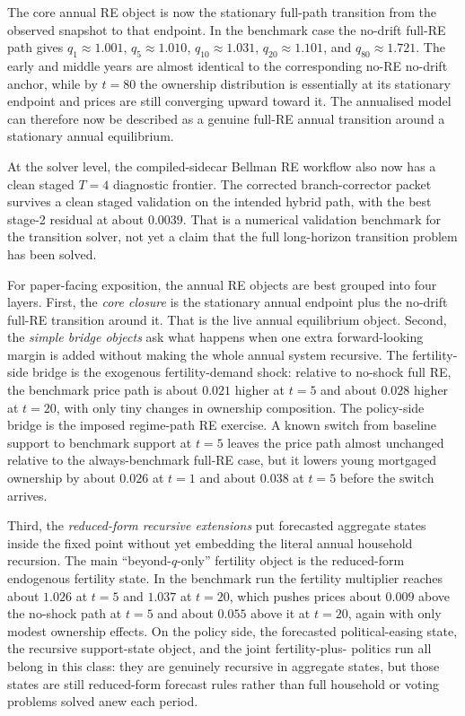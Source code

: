 The core annual RE object is now the stationary full-path transition from the observed
snapshot to that endpoint. In the benchmark case the no-drift full-RE path gives
$q_1 \approx 1.001$, $q_5 \approx 1.010$, $q_{10} \approx 1.031$, $q_{20} \approx 1.101$, and
$q_{80} \approx 1.721$. The early and middle years are almost identical to the corresponding
no-RE no-drift anchor, while by $t=80$ the ownership distribution is essentially at its
stationary endpoint and prices are still converging upward toward it. The annualised model can
therefore now be described as a genuine full-RE annual transition around a stationary annual
equilibrium.

At the solver level, the compiled-sidecar Bellman RE workflow also now has a clean staged
$T=4$ diagnostic frontier. The corrected branch-corrector packet survives a clean staged
validation on the intended hybrid path, with the best stage-2 residual at about $0.0039$.
That is a numerical validation benchmark for the transition solver, not yet a claim that the
full long-horizon transition problem has been solved.

For paper-facing exposition, the annual RE objects are best grouped into four layers. First,
the \emph{core closure} is the stationary annual endpoint plus the no-drift full-RE transition
around it. That is the live annual equilibrium object. Second, the \emph{simple bridge
objects} ask what happens when one extra forward-looking margin is added without making the
whole annual system recursive. The fertility-side bridge is the exogenous fertility-demand
shock: relative to no-shock full RE, the benchmark price path is about $0.021$ higher at
$t=5$ and about $0.028$ higher at $t=20$, with only tiny changes in ownership composition. The
policy-side bridge is the imposed regime-path RE exercise. A known switch from baseline
support to benchmark support at $t=5$ leaves the price path almost unchanged relative to the
always-benchmark full-RE case, but it lowers young mortgaged ownership by about $0.026$ at
$t=1$ and about $0.038$ at $t=5$ before the switch arrives.

Third, the \emph{reduced-form recursive extensions} put forecasted aggregate states inside the
fixed point without yet embedding the literal annual household recursion. The main
``beyond-$q$-only'' fertility object is the reduced-form endogenous fertility state. In the
benchmark run the fertility multiplier reaches about $1.026$ at $t=5$ and $1.037$ at $t=20$,
which pushes prices about $0.009$ above the no-shock path at $t=5$ and about $0.055$ above it
at $t=20$, again with only modest ownership effects. On the policy side, the forecasted
political-easing state, the recursive support-state object, and the joint fertility-plus-
politics run all belong in this class: they are genuinely recursive in aggregate states, but
those states are still reduced-form forecast rules rather than full household or voting
problems solved anew each period.

